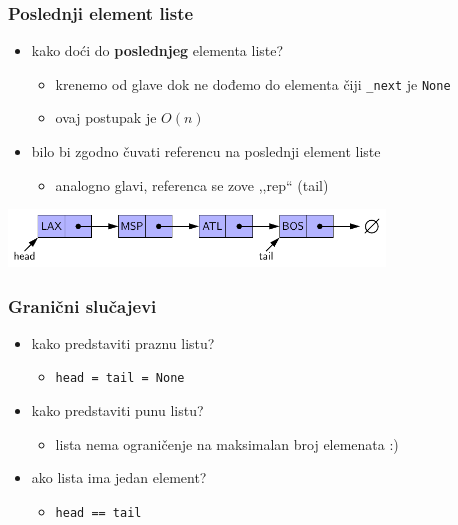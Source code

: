 \documentclass[compress,aspectratio=169]{beamer}
\begin{document}
\begin{frame}[fragile]
  \frametitle{Poslednji element liste}
  \begin{itemize}
    \item kako doći do \textbf{poslednjeg} elementa liste?
    \begin{itemize}
      \item krenemo od glave dok ne dođemo do elementa čiji \texttt{\_next} je \texttt{None}
      \item ovaj postupak je $O(n)$
    \end{itemize}
    \item bilo bi zgodno čuvati referencu na poslednji element liste
    \begin{itemize}
      \item analogno glavi, referenca se zove ,,rep`` (tail)
    \end{itemize}
  \end{itemize}
  \begin{center}
    \includegraphics[width=10cm]{asp-07-pic02a.pdf}
  \end{center}
\end{frame}

\begin{frame}[fragile]
  \frametitle{Granični slučajevi}
  \begin{itemize}
    \item kako predstaviti praznu listu?
    \begin{itemize}
      \item \texttt{head = tail = None}
    \end{itemize}
    \item kako predstaviti punu listu?
    \begin{itemize}
      \item lista nema ograničenje na maksimalan broj elemenata :)
    \end{itemize}
    \item ako lista ima jedan element?
    \begin{itemize}
      \item \texttt{head == tail}
    \end{itemize}
  \end{itemize}
\end{frame}
\end{document}
